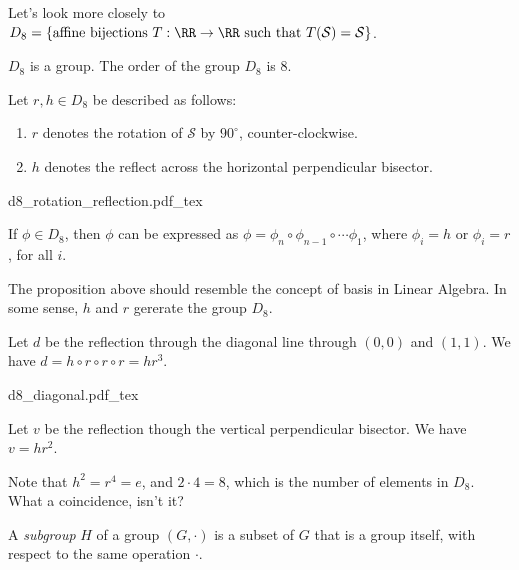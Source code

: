 
Let's look more closely to $D_8 = \{\text{affine bijections}\ T : \RR \to \RR\ \text{such that}\ T(\mathcal{S}) = \mathcal{S}\}$.
 
\begin{prop}\label{l3:d8}
	$D_8$ is a group. The order of the group $D_8$ is $8$.
\end{prop}

\begin{prop}
	Let $r, h \in D_8$ be described as follows:
	\begin{enumerate}
		\item $r$ denotes the rotation of $\mathcal{S}$ by $90^\circ$, counter-clockwise.
		\item $h$ denotes the reflect across the horizontal perpendicular bisector. 
	\end{enumerate}

	\begin{center}
		\def\svgwidth{5cm}
		{d8_rotation_reflection.pdf_tex}
	\end{center}
	
	If $\phi \in D_8$, then $\phi$ can be expressed as  $\phi = \phi_{n} \circ \phi_{n-1} \circ \cdots \phi_1$, where  $\phi_i = h$ or $\phi_i = r$, for all $i$. 
\end{prop}

The proposition above should resemble the concept of basis in Linear Algebra. In some sense, $h$ and $r$ gererate the group $D_8$.

\begin{exmp}
	Let $d$ be the reflection through the diagonal line through $(0,0)$ and $(1,1)$. We have $d = h \circ r \circ r \circ r = hr^3$.
	\begin{center}
		\def\svgwidth{4.5cm}
		{d8_diagonal.pdf_tex}
	\end{center}
\end{exmp}

\begin{exmp}
	Let $v$ be the reflection though the vertical perpendicular bisector. We have $v = hr^2$.
\end{exmp}

Note that $h^2 = r^4 = e$, and $2 \cdot 4 = 8$, which is the number of elements in $D_8$. What a coincidence, isn't it?

\begin{defn}
	A \emph{subgroup} $H$ of a group $(G, \cdot)$ is a subset of  $G$ that is a group itself, with respect to the same operation $\cdot$.
\end{defn}

